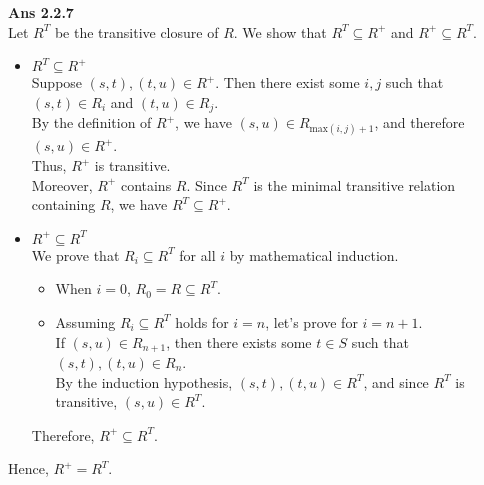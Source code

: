 \documentclass[a4paper,11pt,fleqn,dvipdfmx]{article}
\newcommand{\ansen}[1]{\noindent\textbf{Ans #1}\\[2mm]}
\newcommand{\qed}[0]{\hfill\fbox{}}
\begin{document}
    \ansen{2.2.7}
        Let $R^{T}$ be the transitive closure of $R$. We show that $R^{T} \subseteq R^{+}$ and $R^{+} \subseteq R^{T}$.
        \begin{itemize}
            \item $R^{T} \subseteq R^{+}$ \\[2mm]
                Suppose $(s,t), (t,u) \in R^{+}$. Then there exist some $i,j$ such that $(s,t) \in R_i$ and $(t,u) \in R_j$. \\
                By the definition of $R^{+}$, we have $(s,u) \in R_{\mathrm{max}(i,j)+1}$, and therefore $(s,u) \in R^{+}$. \\
                Thus, $R^{+}$ is transitive. \\
                Moreover, $R^{+}$ contains $R$. Since $R^{T}$ is the minimal transitive relation containing $R$, we have $R^{T} \subseteq R^{+}$.
            \item $R^{+} \subseteq R^{T}$ \\[2mm]
                We prove that $R_i \subseteq R^{T}$ for all $i$ by mathematical induction.
                \begin{itemize}
                    \item When $i=0$, $R_0 = R \subseteq R^{T}$.
                    \item Assuming $R_i \subseteq R^{T}$ holds for $i=n$, let's prove for $i=n+1$. \\
                        If $(s,u) \in R_{n+1}$, then there exists some $t \in S$ such that $(s,t),(t,u) \in R_n$. \\
                        By the induction hypothesis, $(s,t),(t,u) \in R^{T}$, and since $R^{T}$ is transitive, $(s,u) \in R^{T}$.
                \end{itemize}
                Therefore, $R^{+} \subseteq R^{T}$.
        \end{itemize}
        Hence, $R^{+} = R^{T}$.\qed
\end{document}
